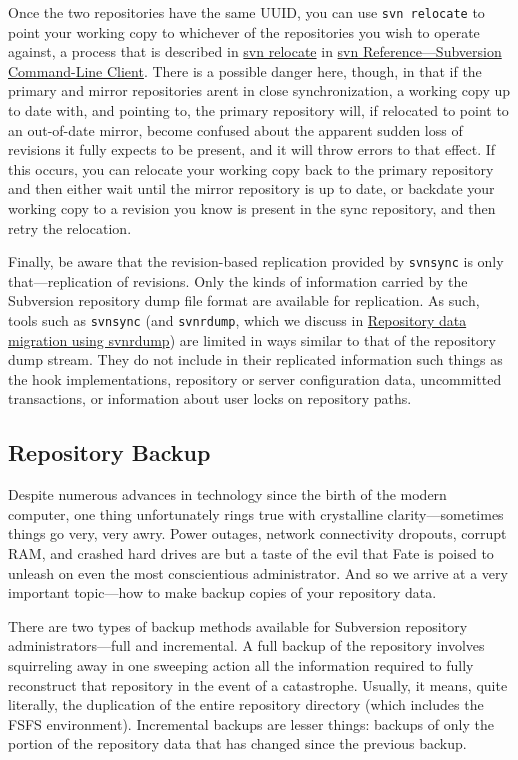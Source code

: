 Once the two repositories have the same UUID, you can use
\texttt{svn\ relocate} to point your working copy to whichever of the
repositories you wish to operate against, a process that is described in
\hyperref[svn.ref.svn.c.relocate]{svn relocate} in
\hyperref[svn.ref.svn]{svn Reference---Subversion Command-Line Client}.
There is a possible danger here, though, in that if the primary and
mirror repositories aren\textquotesingle t in close synchronization, a
working copy up to date with, and pointing to, the primary repository
will, if relocated to point to an out-of-date mirror, become confused
about the apparent sudden loss of revisions it fully expects to be
present, and it will throw errors to that effect. If this occurs, you
can relocate your working copy back to the primary repository and then
either wait until the mirror repository is up to date, or backdate your
working copy to a revision you know is present in the sync repository,
and then retry the relocation.

Finally, be aware that the revision-based replication provided by
\texttt{svnsync} is only that---replication of revisions. Only the kinds
of information carried by the Subversion repository dump file format are
available for replication. As such, tools such as \texttt{svnsync} (and
\texttt{svnrdump}, which we discuss in
\hyperref[svn.reposadmin.maint.migrate.svnrdump]{Repository data
migration using svnrdump}) are limited in ways similar to that of the
repository dump stream. They do not include in their replicated
information such things as the hook implementations, repository or
server configuration data, uncommitted transactions, or information
about user locks on repository paths.

\subsection{Repository Backup}\label{svn.reposadmin.maint.backup}

Despite numerous advances in technology since the birth of the modern
computer, one thing unfortunately rings true with crystalline
clarity---sometimes things go very, very awry. Power outages, network
connectivity dropouts, corrupt RAM, and crashed hard drives are but a
taste of the evil that Fate is poised to unleash on even the most
conscientious administrator. And so we arrive at a very important
topic---how to make backup copies of your repository data.

There are two types of backup methods available for Subversion
repository administrators---full and incremental. A full backup of the
repository involves squirreling away in one sweeping action all the
information required to fully reconstruct that repository in the event
of a catastrophe. Usually, it means, quite literally, the duplication of
the entire repository directory (which includes the FSFS
environment). Incremental backups are lesser things: backups of
only the portion of the repository data that has changed since the
previous backup.

